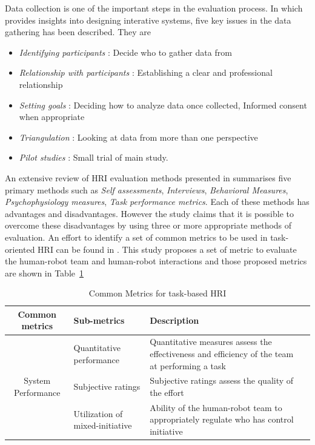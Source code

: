 {Data collection is one of the important steps in the evaluation process. In \cite{Rogers2011} which provides insights into designing interative systems, five key issues in the data gathering has been described. They are 
\begin{itemize}
\item \emph{Identifying participants} : Decide who to gather data from
\item \emph{Relationship with participants} : Establishing a clear and professional relationship
\item \emph{Setting goals} : Deciding how to analyze data once collected, Informed consent when appropriate
\item \emph{Triangulation} : Looking at data from more than one perspective
\item \emph{Pilot studies} : Small trial of main study. 
\end{itemize}
An extensive review of HRI evaluation methods presented in \cite{bethel2010review} summarises five primary methods such as \emph{Self assessments}, \emph{Interviews}, \emph{Behavioral Measures}, \emph{Psychophysiology measures}, \emph{Task performance metrics}. Each of these methods has advantages and disadvantages. However the study claims that it is possible to overcome these disadvantages by using three or more appropriate methods of evaluation. An effort to identify a set of common metrics to be used in task-oriented HRI can be found in \cite{Steinfeld2006}. This study proposes a set of metric to evaluate the human-robot team and human-robot interactions and those proposed metrics are shown in Table~\ref{table:hri_metrics}
\begin{table}[H]
\centering
\small
\caption{Common Metrics for task-based HRI}
\label{table:hri_metrics}
\begin{tabularx}{400pt}{c*3{X}}
\toprule
  \textbf{Common metrics} & \textbf{Sub-metrics} 
                          & \textbf{Description}
  \tabularnewline \midrule
  
  \multirow{4}{*}{System Performance} & Quantitative performance & Quantitative measures assess the
effectiveness and efficiency of the team at performing a task \\
                                      & Subjective ratings & Subjective ratings assess the quality
of the effort \\
                                      & Utilization of mixed-initiative & Ability of the human-robot team to appropriately regulate who has control initiative 
                                          \tabularnewline\midrule
                                          

\end{tabularx}
\end{table}}
